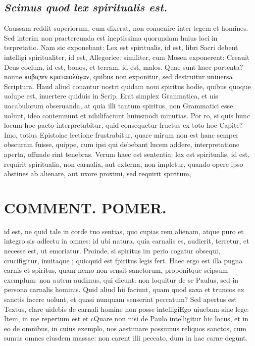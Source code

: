 \documentclass{article}
\begin{document}
\begin{pages}
\subsection*{\textit{Scimus quod lex spiritualis est. }}\pstart Caussam reddit superiorum, cum dixerat, non conuenire inter legem et homines. Sed interim non praetereunda est ineptissima quorundam huius loci in terpretatio. Nam sic exponebant: Lex est spiritualis, id est, libri Sacri debent intelligi spiritualiter, id est, Allegorice: similiter, cum Mosen exponerent: Creauit Deus coelum, id est, bonos, et terram, id est, malos. Quae sunt haec portenta? nonne κυβιςwν κματαιολόγαν, quibus non exponitur, sed destruitur uniuersa Scriptura. Haud aliud conantur nostri quidam noui spiritus hodie, quibus quoque uolupe est, inuertere quiduis in Scrip. Erat simplex Granmatica, et uis uocabulorum obseruanda, at quia illi tantum spiritus, non Grammatici esse uolunt, ideo contemnunt et nihilifaciunt huiusmodi minutias. Por ro, si quis hunc locum hoc pacto interpretabitur, quid consequetur fructus ex toto hoc Capite? Imo, totius Epistolae lectione frustrabitur, quare mirum non est hanc semper obscuram fuisse, quippe, cum ipsi qui debebant lucem addere, interpretatione aperta, offunde rint tenebras. Verum haec est sententia: lex est spiritualis, id est, requirit spiritualia, non carnalia, aut externa, non impletur, quando opere ipso abstines ab alienare, aut uxore proximi, sed requirit spiritum,  \pend
\section*{COMMENT. POMER.  }\pstart id est, ne quid tale in corde tuo sentias, quo cupias rem alienam, atque puro et integro sis adfectu in omnes: id ubi natura, quia carnalis es, audierit, terretur, et necesse est, ut emoriatur. Proinde, si spiritus im perio cogatur obsequi, crucifigitur, inuitaque ; quicquid est fpiritus legis fert. Haec ergo est illa pugna carnis et spiritus, quam nemo non sensit sanctorum, proponitque seipsum exemplum: non autem audimus, qui dicunt: non loquitur de se Paulus, sed in persona carnalis hominis. Quid aliud hii faciunt, quam quod saxa et truncos ex sanctis facere uolunt, et quasi nunquam senserint peccatum? Sed apertus est Textus, clare uidebis de carnali homine non posse intelligiEgo uiuebam sine lege: Item, in me repertum est et cQuare non nisi de Paulo intelligitur hic locus, et in eo de omnibus, in cuius exemplo, nos aestimare possumus reliquos sanctos, cum sumus omnes eiusdem massae: non carent illi peccato, dum in hac carne degunt.   \pend
{}
{}

\end{pages}
\end{document}
